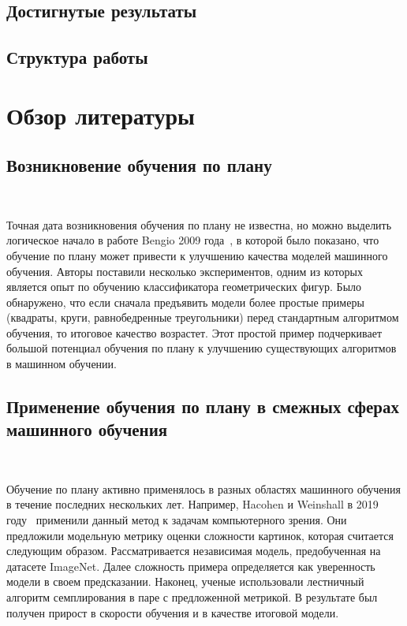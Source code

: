 \documentclass{spbau-diploma}
\begin{document}
\subsection*{Достигнутые результаты}
\subsection*{Структура работы}
\section{Обзор литературы} \label{sec:literature}
\subsection{Возникновение обучения по плану}
\ 

Точная дата возникновения обучения по плану не известна, но можно выделить логическое начало в работе Bengio 2009 года~\cite{bengio2009curriculum}, в которой было показано, что обучение по плану может привести к улучшению качества моделей машинного обучения. Авторы поставили несколько экспериментов, одним из которых является опыт по обучению классификатора геометрических фигур. Было обнаружено, что если сначала предъявить модели более простые примеры (квадраты, круги, равнобедренные треугольники) перед стандартным алгоритмом обучения, то итоговое качество возрастет. Этот простой пример подчеркивает большой потенциал обучения по плану к улучшению существующих алгоритмов в машинном обучении.
\subsection{Применение обучения по плану в смежных сферах машинного обучения}
\ 

Обучение по плану активно применялось в разных областях машинного обучения в течение последних нескольких лет. Например, Hacohen и Weinshall в 2019 году~\cite{hacohen2019power} применили данный метод к задачам компьютерного зрения. Они предложили модельную метрику оценки сложности картинок, которая считается следующим образом. Рассматривается независимая модель, предобученная на датасете ImageNet. Далее сложность примера определяется как уверенность модели в своем предсказании. Наконец, ученые использовали лестничный алгоритм семплирования в паре с предложенной метрикой. В результате был получен прирост в скорости обучения и в качестве итоговой модели.
\end{document}
